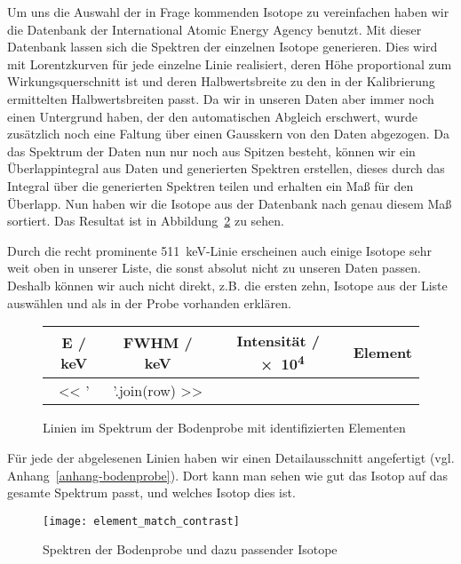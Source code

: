 \documentclass[11pt, ngerman, fleqn, DIV=15, headinclude, BCOR=2cm]{scrreprt}
\newcommand{\plotwidth}{0.8\linewidth}
\begin{document}
Um uns die Auswahl der in Frage kommenden Isotope zu vereinfachen haben wir
die Datenbank der International Atomic Energy Agency
\parencite{IAEA-gamma-ray-database} benutzt. Mit dieser Datenbank lassen sich
die Spektren der einzelnen Isotope generieren. Dies wird mit Lorentzkurven für
jede einzelne Linie 
realisiert, deren Höhe proportional zum Wirkungsquerschnitt ist und deren
Halbwertsbreite zu den in der Kalibrierung ermittelten Halbwertsbreiten
passt.
Da wir in unseren Daten aber immer noch einen Untergrund haben, der den
automatischen Abgleich erschwert, wurde zusätzlich noch  eine Faltung über
einen Gausskern von den Daten abgezogen. Da das Spektrum der Daten nun nur noch
aus Spitzen besteht, können wir ein Überlappintegral aus Daten und generierten
Spektren erstellen, dieses durch das Integral über die generierten Spektren
teilen und erhalten ein Maß für den Überlapp. Nun haben wir die Isotope aus
der Datenbank nach genau diesem Maß sortiert. 
Das Resultat ist in Abbildung~\ref{fig:element_match} zu sehen.

Durch die recht prominente \SI{511}{\kilo\electronvolt}-Linie erscheinen auch
einige Isotope sehr weit oben in unserer Liste, die sonst absolut nicht zu
unseren Daten passen. Deshalb können wir auch nicht direkt, z.B. die ersten
zehn, Isotope aus der Liste auswählen und als in der Probe vorhanden erklären.

\begin{figure}[h]
	\centering
	\begin{tabular}{SSSl}
		{E / \si{\kilo\electronvolt}} &
		{FWHM / \si{\kilo\electronvolt}} &
            {Intensität / \num{e4}} &
            {Element}\\
		\midrule
		<< ' & '.join(row) >> \\
	\end{tabular}
	\caption{%
		Linien im Spektrum der Bodenprobe mit identifizierten Elementen
	}
	\label{tab:langzeit-anpassungen-tabelle}
\end{figure}

Für jede der abgelesenen Linien haben wir
einen Detailausschnitt angefertigt (vgl. Anhang~\ref{anhang-bodenprobe}).
Dort kann man sehen wie gut das Isotop auf das gesamte Spektrum passt, und
welches Isotop dies ist.

\begin{figure}
    \centering
    \texttt{[image: element\_match\_contrast]}
    \caption{%
	    Spektren der Bodenprobe und dazu passender Isotope
    }
    \label{fig:element_match}
\end{figure}
\end{document}

